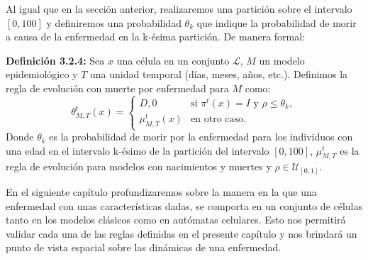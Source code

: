 Al igual que en la sección anterior, realizaremos una partición sobre el intervalo $[0,100]$ y definiremos una probabilidad $\theta_k$ que indique la probabilidad de morir a causa de la enfermedad en la k-ésima partición. De manera formal:

\textbf{Definición 3.2.4:} Sea $x$ una célula en un conjunto $\mathcal{L}$, $M$ un modelo epidemiológico y $T$ una unidad temporal (días, meses, años, etc.). Definimos la regla de evolución con muerte por enfermedad para $M$ como:
\begin{equation}
    \theta_{M,T}^t(x)=\left\{\begin{array}{ll}
        D,0 & \text{si }\pi^t(x)=I\text{ y }\rho\leq\theta_k, \\
        \mu_{M,T}^t(x) & \text{en otro caso.}
    \end{array}\right.
\end{equation}
Donde $\theta_k$ es la probabilidad de morir por la enfermedad para los individuos con una edad en el intervalo k-ésimo de la partición del intervalo $[0,100]$, $\mu_{M,T}^t$ es la regla de evolución para modelos con nacimientos y muertes y $\rho\in\mathcal{U}_{[0,1]}$.

En el siguiente capítulo profundizaremos sobre la manera en la que una enfermedad con unas características dadas, se comporta en un conjunto de células tanto en los modelos clásicos como en autómatas celulares. Esto nos permitirá validar cada una de las reglas definidas en el presente capítulo y nos brindará un punto de vista espacial sobre las dinámicas de una enfermedad.